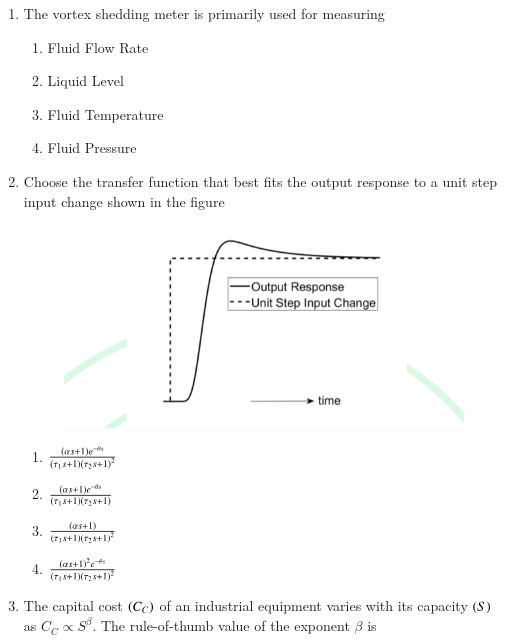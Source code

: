 \documentclass[journal,12pt,onecolumn]{IEEEtran}
\theoremstyle{remark}
\begin{document}
\begin{enumerate}
		\item The vortex shedding meter is primarily used for measuring
		
		\hfill{}
		
		\begin{multicols}{2}
			\begin{enumerate}
				\item Fluid Flow Rate
				\item Liquid Level
				\item Fluid Temperature
				\item Fluid Pressure
			\end{enumerate}
		\end{multicols}
		
		\item Choose the transfer function that best fits the output response to a unit step input change shown in the figure
		\begin{figure}[h]
			\centering
			\includegraphics[width=0.5\columnwidth]{q25.png}
			\caption*{}
			\label{fig:q25}
		\end{figure}
		
		\hfill{}
		
		\begin{enumerate}
			\item $\frac{\left(\alpha s + 1\right)e^{-\theta s}}{\left(\tau_1 s + 1\right)\left(\tau_2 s + 1\right)^2}$
			\item $\frac{\left(\alpha s + 1\right)e^{-\theta s}}{\left(\tau_1 s + 1\right)\left(\tau_2 s + 1\right)}$
			\item $\frac{\left(\alpha s + 1\right)}{\left(\tau_1 s + 1\right)\left(\tau_2 s + 1\right)^2}$
			\item $\frac{\left(\alpha s + 1\right)^2e^{-\theta s}}{\left(\tau_1 s + 1\right)\left(\tau_2 s + 1\right)^2}$
		\end{enumerate}
		
		\item The capital cost $\left(C_C\right)$ of an industrial equipment varies with its capacity $\left(S\right)$ as $C_C \propto S^{\beta}$. The rule-of-thumb value of the exponent $\beta$ is
		
		\hfill{}
		

\end{enumerate}
\end{document}
